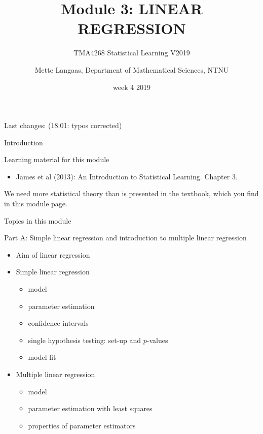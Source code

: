 \documentclass[ignorenonframetext,]{beamer}
\title{Module 3: LINEAR REGRESSION}
\subtitle{TMA4268 Statistical Learning V2019}
\author{Mette Langaas, Department of Mathematical Sciences, NTNU}
\date{week 4 2019}
\providecommand{\tightlist}{%
  \setlength{\itemsep}{0pt}\setlength{\parskip}{0pt}}
\begin{document}
\frame{\titlepage}

\begin{frame}

Last changes: (18.01: typos corrected)

\end{frame}

\begin{frame}{Introduction}

\begin{block}{Learning material for this module}

\begin{itemize}
\tightlist
\item
  James et al (2013): An Introduction to Statistical Learning. Chapter
  3.
\end{itemize}

We need more statistical theory than is presented in the textbook, which
you find in this module page.

\end{block}

\end{frame}

\begin{frame}

\begin{block}{Topics in this module}

\begin{block}{Part A: Simple linear regression and introduction to
multiple linear regression}

\begin{itemize}
\tightlist
\item
  Aim of linear regression
\item
  Simple linear regression

  \begin{itemize}
  \tightlist
  \item
    model
  \item
    parameter estimation
  \item
    confidence intervals
  \item
    single hypothesis testing: set-up and \(p\)-values
  \item
    model fit
  \end{itemize}
\item
  Multiple linear regression

  \begin{itemize}
  \tightlist
  \item
    model
  \item
    parameter estimation with least squares
  \item
    properties of parameter estimators
  \end{itemize}
\end{itemize}

\end{block}

\end{block}

\end{frame}
\end{document}
